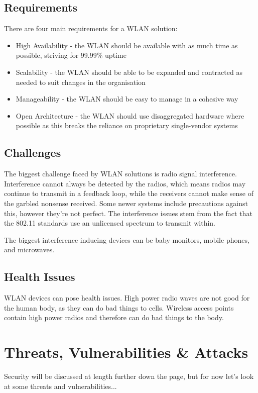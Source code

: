 \subsection{Requirements}
There are four main requirements for a WLAN solution:
\begin{itemize}
    \item High Availability - the WLAN should be available with as much time as possible, striving for 99.99\% uptime
    \item Scalability - the WLAN should be able to be expanded and contracted as needed to suit changes in the organisation
    \item Manageability - the WLAN should be easy to manage in a cohesive way
    \item Open Architecture - the WLAN should use disaggregated hardware where possible as this breaks the reliance on proprietary single-vendor systems
\end{itemize}

\subsection{Challenges}
The biggest challenge faced by WLAN solutions is radio signal interference. Interference cannot always be detected by the radios, which means radios may continue to transmit in a feedback loop, while the receivers cannot make sense of the garbled nonsense received. Some newer systems include precautions against this, however they're not perfect. The interference issues stem from the fact that the 802.11 standards use an unlicensed spectrum to transmit within. 

The biggest interference inducing devices can be baby monitors, mobile phones, and microwaves.

\subsection{Health Issues}
WLAN devices can pose health issues. High power radio waves are not good for the human body, as they can do bad things to cells. Wireless access points contain high power radios and therefore can do bad things to the body. 

\section{Threats, Vulnerabilities \& Attacks}
Security will be discussed at length further down the page, but for now let's look at some threats and vulnerabilities... 

